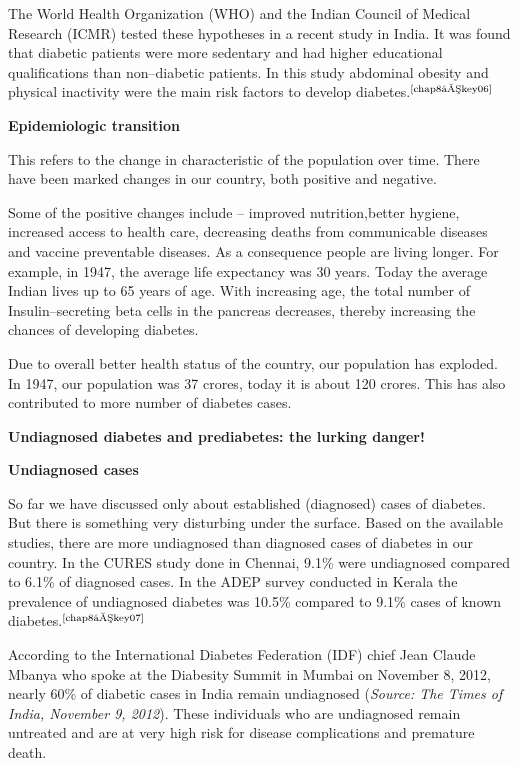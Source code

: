 The World Health Organization (WHO) and the Indian Council of Medical Research (ICMR) tested these hypotheses in a recent study in India. It was found that diabetic patients were more sedentary and had higher educational qualifications than non–diabetic patients. In this study abdominal obesity and physical inactivity were the main risk factors to develop diabetes.$^{\text{\cite{chap8–key06}}}$

\vskip 6pt
\noindent\textbf{Epidemiologic transition}
\vskip 6pt

This refers to the change in characteristic of the population over time. There have been marked changes in our country, both positive and negative.

Some of the positive changes include – improved nutrition,\break better hygiene, increased access to health care, decreasing deaths from communicable diseases and vaccine preventable diseases. As a consequence people are living longer. For example, in 1947, the ave\-rage life expectancy was 30 years. Today the average Indian lives up to 65 years of age. With increasing age, the total number of Insulin–secreting beta cells in the pancreas decreases, thereby increasing the chances of deve\-loping diabetes.

\clearpage

Due to overall better health status of the country, our population has exploded. In 1947, our population was 37 crores, today it is about 120 crores. This has also contributed to more number of diabetes cases.

\vskip 6pt
\noindent\textbf{Undiagnosed diabetes and prediabetes: the lurking danger!}

\vskip 5pt
\noindent\textbf{Undiagnosed cases}
\vskip 5pt

So far we have discussed only about established (diagnosed) cases of diabetes. But there is something very disturbing under the surface. Based on the available studies, there are more undiagnosed than dia\-gnosed cases of diabetes in our country. In the CURES study done in Chennai, 9.1\% were undiagnosed compared to 6.1\% of diagnosed cases. In the ADEP survey conducted in Kerala the prevalence of undiagnosed diabetes was 10.5\% compared to 9.1\% cases of known diabetes.$^{\text{\cite{chap8–key07}}}$

According to the International Diabetes Federation (IDF) chief Jean Claude Mbanya who spoke at the Diabesity Summit in Mumbai on Nove\-mber 8, 2012, nearly 60\% of diabetic cases in India remain undiagnosed (\textit{Source: The Times of India, November 9, 2012}). These individuals who are undiagnosed remain untreated and are at very high risk for disease complications and premature death.


